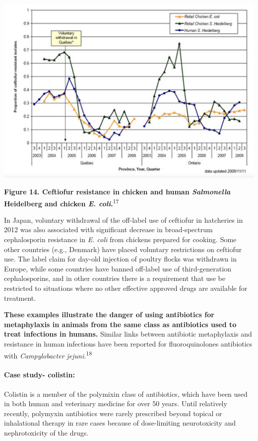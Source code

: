 \documentclass[
  11pt,
  paper=a4,
  ,captions=tableheading
]{scrartcl}
\begin{document}
\includegraphics[width=6.25in,height=\textheight]{images/Canada_ecoli.png}

\textbf{Figure 14. Ceftiofur resistance in chicken and human
\emph{Salmonella} Heidelberg and chicken \emph{E.
coli}.}\textsuperscript{17}

In Japan, voluntary withdrawal of the off-label use of ceftiofur in
hatcheries in 2012 was also associated with significant decrease in
broad-spectrum cephalosporin resistance in \emph{E. coli} from chickens
prepared for cooking. Some other countries (e.g., Denmark) have placed
voluntary restrictions on ceftiofur use. The label claim for day-old
injection of poultry flocks was withdrawn in Europe, while some
countries have banned off-label use of third-generation cephalosporins,
and in other countries there is a requirement that use be restricted to
situations where no other effective approved drugs are available for
treatment.

\textbf{These examples illustrate the danger of using antibiotics for
metaphylaxis in animals from the same class as antibiotics used to treat
infections in humans.} Similar links between antibiotic metaphylaxis and
resistance in human infections have been reported for fluoroquinolones
antibiotics with \emph{Campylobacter jejuni.}\textsuperscript{18}

\hypertarget{case-study--colistin}{%
\paragraph*{Case study- colistin:}\label{case-study--colistin}}

Colistin is a member of the polymixin class of antibiotics, which have
been used in both human and veterinary medicine for over 50 years. Until
relatively recently, polymyxin antibiotics were rarely prescribed beyond
topical or inhalational therapy in rare cases because of dose-limiting
neurotoxicity and nephrotoxicity of the drugs.
\end{document}
